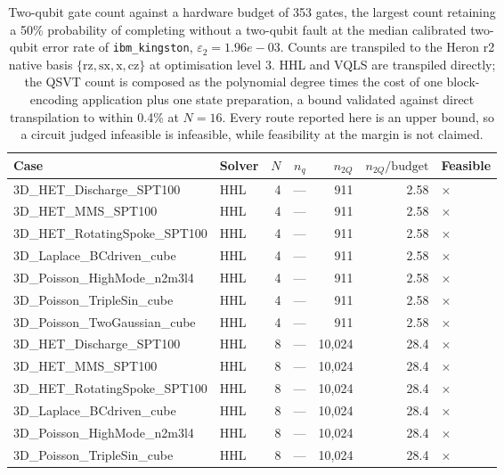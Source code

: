 \begin{table}[htbp]
  \centering
  \caption{Two-qubit gate count against a hardware budget of 353 gates, the largest count retaining a 50\% probability of completing without a two-qubit fault at the median calibrated two-qubit error rate of \texttt{ibm\_kingston}, $\varepsilon_2 = 1.96e-03$. Counts are transpiled to the Heron r2 native basis $\{\mathrm{rz}, \mathrm{sx}, \mathrm{x}, \mathrm{cz}\}$ at optimisation level 3. HHL and VQLS are transpiled directly; the QSVT count is composed as the polynomial degree times the cost of one block-encoding application plus one state preparation, a bound validated against direct transpilation to within 0.4\% at $N=16$. Every route reported here is an upper bound, so a circuit judged infeasible is infeasible, while feasibility at the margin is not claimed.}
  \label{tab:hardware_feasibility}
  \begin{tabular}{llrrrrl}
    \toprule
    Case & Solver & $N$ & $n_q$ & $n_{2Q}$ & $n_{2Q}/\mathrm{budget}$ & Feasible \\
    \midrule
    3D\_HET\_Discharge\_SPT100 & HHL & 4 & --- & 911 & 2.58 & $\times$ \\
    3D\_HET\_MMS\_SPT100 & HHL & 4 & --- & 911 & 2.58 & $\times$ \\
    3D\_HET\_RotatingSpoke\_SPT100 & HHL & 4 & --- & 911 & 2.58 & $\times$ \\
    3D\_Laplace\_BCdriven\_cube & HHL & 4 & --- & 911 & 2.58 & $\times$ \\
    3D\_Poisson\_HighMode\_n2m3l4 & HHL & 4 & --- & 911 & 2.58 & $\times$ \\
    3D\_Poisson\_TripleSin\_cube & HHL & 4 & --- & 911 & 2.58 & $\times$ \\
    3D\_Poisson\_TwoGaussian\_cube & HHL & 4 & --- & 911 & 2.58 & $\times$ \\
    3D\_HET\_Discharge\_SPT100 & HHL & 8 & --- & 10,024 & 28.4 & $\times$ \\
    3D\_HET\_MMS\_SPT100 & HHL & 8 & --- & 10,024 & 28.4 & $\times$ \\
    3D\_HET\_RotatingSpoke\_SPT100 & HHL & 8 & --- & 10,024 & 28.4 & $\times$ \\
    3D\_Laplace\_BCdriven\_cube & HHL & 8 & --- & 10,024 & 28.4 & $\times$ \\
    3D\_Poisson\_HighMode\_n2m3l4 & HHL & 8 & --- & 10,024 & 28.4 & $\times$ \\
    3D\_Poisson\_TripleSin\_cube & HHL & 8 & --- & 10,024 & 28.4 & $\times$ \\

\end{tabular}
\end{table}
